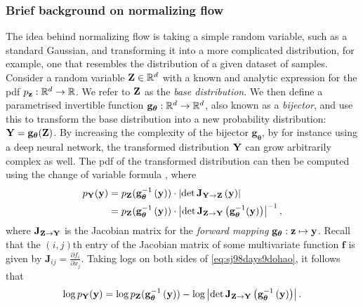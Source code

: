 \documentclass{statsmsc}
\begin{document}
{\subsubsection{Brief background on normalizing flow}%
\label{ssub:Brief background on normalizing flow}

The idea behind normalizing flow is taking a simple random variable, such as a standard
Gaussian, and transforming it into a more complicated distribution, for example, one that
resembles the distribution of a given dataset of samples.
Consider a random variable $\mathbf{Z} \in \mathbb{R}^d$ with a known and
analytic expression for the \ac{pdf} $p_{\mathbf{z}}: \mathbb{R}^d \rightarrow {\mathbb{R}}$. We refer to $\mathbf{Z}$ as
the \textit{base distribution}. We then define
a parametrised invertible function
$\mathbf{g}_{\bm \theta}:\mathbb{R}^d \rightarrow {\mathbb{R}^d}$, also known as a \textit{bijector},
and use this to transform the base distribution into a new
 probability distribution: $\mathbf{Y}=\mathbf{g}_{\bm\theta}(\mathbf{Z})$.
By increasing the complexity of the bijector $\mathbf{g}_{\bm\theta}$, by for instance using
a deep neural network, the transformed distribution $\mathbf{Y}$ can grow arbitrarily complex as well.
The \ac{pdf} of the transformed distribution can then be computed using the change of variable
formula \citep{normalizing_flows}, where
\begin{align}
    p_{\mathbf{Y}}(\mathbf{y})&=p_{\mathbf{Z}}(\mathbf{g}_{\bm\theta}^{-1}\left(\mathbf{y}\right))\cdot \left|\det \mathbf{J}_{\mathbf{Y} \rightarrow {\mathbf{Z}}}\left(\mathbf{y} \right) \right| \nonumber \\
                & = p_{\mathbf{Z}}(\mathbf{g}_{\bm\theta}^{-1}\left(\mathbf{y}\right))\cdot \left|\det \mathbf{J}_{\mathbf{Z} \rightarrow {\mathbf{Y}}}\left( \mathbf{g}^{-1}_{\bm\theta}(\mathbf{y}) \right) \right|^{-1}, \label{eq:sj98days9dohao}
\end{align}
where $\mathbf{J}_{\mathbf{Z} \rightarrow {\mathbf{Y}}}$ is the Jacobian matrix for the \textit{forward mapping}
$\mathbf{g}_{\bm\theta} : \mathbf{z} \mapsto \mathbf{y}$. Recall
that the $(i,j)$th entry of the Jacobian matrix of some multivariate function $\mathbf{f}$ is
given by $\mathbf{J}_{ij}=\frac{\partial f_i}{\partial x_j}$.
Taking logs on both sides of \cref{eq:sj98days9dohao}, it follows that
\begin{equation}\label{eq:logDetJac}
    \log p_{\mathbf{Y}}(\mathbf{y})= \log p_{\mathbf{Z}}(\mathbf{g}_{\bm\theta}^{-1}\left(\mathbf{y}\right)) - \log \left|\det \mathbf{J}_{\mathbf{Z} \rightarrow {\mathbf{Y}}}\left(\mathbf{g}_{\bm\theta}^{-1}\left(\mathbf{y}\right) \right) \right|.
\end{equation}

}
\end{document}
